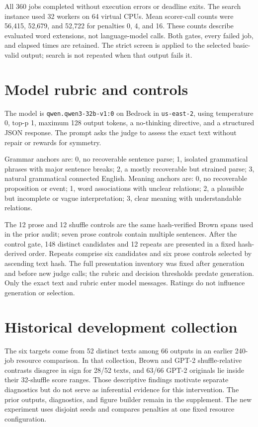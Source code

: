 \documentclass[11pt]{article}
\newcommand{\code}[1]{\texttt{#1}}
\begin{document}
All 360 jobs completed without execution errors or deadline exits. The search instance used 32 workers on 64 virtual CPUs. Mean scorer-call counts were 56,415, 52,679, and 52,722 for penalties 0, 4, and 16. These counts describe evaluated word extensions, not language-model calls. Both gates, every failed job, and elapsed times are retained. The strict screen is applied to the selected basic-valid output; search is not repeated when that output fails it.

\section{Model rubric and controls}\label{sec:rubric}
The model is \code{qwen.qwen3-32b-v1:0} on Bedrock in \code{us-east-2}, using temperature 0, top-p 1, maximum 128 output tokens, a no-thinking directive, and a structured JSON response. The prompt asks the judge to assess the exact text without repair or rewards for symmetry.

Grammar anchors are: 0, no recoverable sentence parse; 1, isolated grammatical phrases with major sentence breaks; 2, a mostly recoverable but strained parse; 3, natural grammatical connected English. Meaning anchors are: 0, no recoverable proposition or event; 1, word associations with unclear relations; 2, a plausible but incomplete or vague interpretation; 3, clear meaning with understandable relations.

The 12 prose and 12 shuffle controls are the same hash-verified Brown spans used in the prior audit; seven prose controls contain multiple sentences. After the control gate, 148 distinct candidates and 12 repeats are presented in a fixed hash-derived order. Repeats comprise six candidates and six prose controls selected by ascending text hash. The full presentation inventory was fixed after generation and before new judge calls; the rubric and decision thresholds predate generation. Only the exact text and rubric enter model messages. Ratings do not influence generation or selection.

\section{Historical development collection}
The six targets come from 52 distinct texts among 66 outputs in an earlier 240-job resource comparison. In that collection, Brown and GPT-2 shuffle-relative contrasts disagree in sign for 28/52 texts, and 63/66 GPT-2 originals lie inside their 32-shuffle score ranges. Those descriptive findings motivate separate diagnostics but do not serve as inferential evidence for this intervention. The prior outputs, diagnostics, and figure builder remain in the supplement. The new experiment uses disjoint seeds and compares penalties at one fixed resource configuration.
\end{document}
